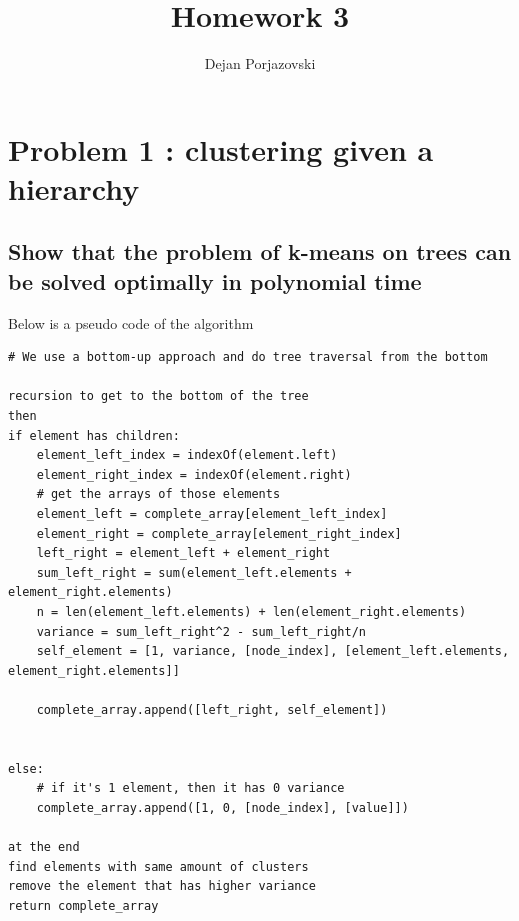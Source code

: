 \documentclass[11pt]{article}
\begin{document}
\title{\textbf{Homework 3}}
\author{Dejan Porjazovski}
\maketitle

\section{Problem 1 : clustering given a hierarchy}
\subsection{Show that the problem of k-means on trees can be solved optimally in polynomial time}
Below is a pseudo code of the algorithm \\

\begin{lstlisting}
# We use a bottom-up approach and do tree traversal from the bottom

recursion to get to the bottom of the tree
then
if element has children:
	element_left_index = indexOf(element.left)
	element_right_index = indexOf(element.right)
	# get the arrays of those elements 
	element_left = complete_array[element_left_index]
	element_right = complete_array[element_right_index]
	left_right = element_left + element_right
	sum_left_right = sum(element_left.elements + element_right.elements)
	n = len(element_left.elements) + len(element_right.elements)
	variance = sum_left_right^2 - sum_left_right/n
	self_element = [1, variance, [node_index], [element_left.elements, element_right.elements]]	
	
	complete_array.append([left_right, self_element])


else:
	# if it's 1 element, then it has 0 variance
	complete_array.append([1, 0, [node_index], [value]])

at the end
find elements with same amount of clusters
remove the element that has higher variance
return complete_array
\end{lstlisting}
\end{document}
